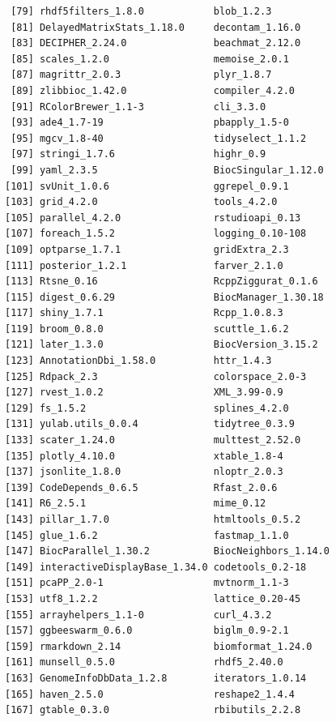 \documentclass[
]{book}
\begin{document}
\begin{verbatim}
 [79] rhdf5filters_1.8.0            blob_1.2.3                   
 [81] DelayedMatrixStats_1.18.0     decontam_1.16.0              
 [83] DECIPHER_2.24.0               beachmat_2.12.0              
 [85] scales_1.2.0                  memoise_2.0.1                
 [87] magrittr_2.0.3                plyr_1.8.7                   
 [89] zlibbioc_1.42.0               compiler_4.2.0               
 [91] RColorBrewer_1.1-3            cli_3.3.0                    
 [93] ade4_1.7-19                   pbapply_1.5-0                
 [95] mgcv_1.8-40                   tidyselect_1.1.2             
 [97] stringi_1.7.6                 highr_0.9                    
 [99] yaml_2.3.5                    BiocSingular_1.12.0          
[101] svUnit_1.0.6                  ggrepel_0.9.1                
[103] grid_4.2.0                    tools_4.2.0                  
[105] parallel_4.2.0                rstudioapi_0.13              
[107] foreach_1.5.2                 logging_0.10-108             
[109] optparse_1.7.1                gridExtra_2.3                
[111] posterior_1.2.1               farver_2.1.0                 
[113] Rtsne_0.16                    RcppZiggurat_0.1.6           
[115] digest_0.6.29                 BiocManager_1.30.18          
[117] shiny_1.7.1                   Rcpp_1.0.8.3                 
[119] broom_0.8.0                   scuttle_1.6.2                
[121] later_1.3.0                   BiocVersion_3.15.2           
[123] AnnotationDbi_1.58.0          httr_1.4.3                   
[125] Rdpack_2.3                    colorspace_2.0-3             
[127] rvest_1.0.2                   XML_3.99-0.9                 
[129] fs_1.5.2                      splines_4.2.0                
[131] yulab.utils_0.0.4             tidytree_0.3.9               
[133] scater_1.24.0                 multtest_2.52.0              
[135] plotly_4.10.0                 xtable_1.8-4                 
[137] jsonlite_1.8.0                nloptr_2.0.3                 
[139] CodeDepends_0.6.5             Rfast_2.0.6                  
[141] R6_2.5.1                      mime_0.12                    
[143] pillar_1.7.0                  htmltools_0.5.2              
[145] glue_1.6.2                    fastmap_1.1.0                
[147] BiocParallel_1.30.2           BiocNeighbors_1.14.0         
[149] interactiveDisplayBase_1.34.0 codetools_0.2-18             
[151] pcaPP_2.0-1                   mvtnorm_1.1-3                
[153] utf8_1.2.2                    lattice_0.20-45              
[155] arrayhelpers_1.1-0            curl_4.3.2                   
[157] ggbeeswarm_0.6.0              biglm_0.9-2.1                
[159] rmarkdown_2.14                biomformat_1.24.0            
[161] munsell_0.5.0                 rhdf5_2.40.0                 
[163] GenomeInfoDbData_1.2.8        iterators_1.0.14             
[165] haven_2.5.0                   reshape2_1.4.4               
[167] gtable_0.3.0                  rbibutils_2.2.8              
\end{verbatim}
\end{document}
